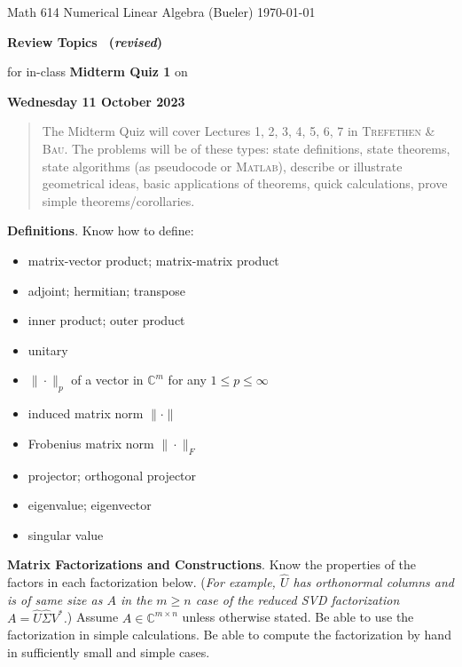 \documentclass[11pt]{amsart}
\newcommand{\normalspacing}{\renewcommand{\baselinestretch}{1.1}\tiny\normalsize}
\newcommand{\bigspacing}{\renewcommand{\baselinestretch}{1.21}\tiny\normalsize}
\newcommand{\CC}{{\mathbb{C}}}
\newcommand{\Matlab}{\textsc{Matlab}\xspace}
\newcommand{\textbook}{\textsc{Trefethen \& Bau}}
\begin{document}
\scriptsize \noindent Math 614 Numerical Linear Algebra (Bueler) \hfill \today
\thispagestyle{empty}

\bigskip
\Large\centerline{\phantom{sd asdf fklj} \textbf{Review Topics \, (\emph{revised})} }

\Large\centerline{for in-class \textbf{Midterm Quiz 1} on}

\Large\centerline{\textbf{Wednesday 11 October 2023}}

\normalsize
\bigskip
\begin{quote}
The Midterm Quiz will cover Lectures 1, 2, 3, 4, 5, 6, 7 in \textbook.  The problems will be of these types: state definitions, state theorems, state algorithms (as pseudocode or \Matlab), describe or illustrate geometrical ideas, basic applications of theorems, quick calculations, prove simple theorems/corollaries.
\end{quote}
\bigskip

\bigspacing
\noindent \textbf{Definitions}. Know how to define:
\begin{itemize}
\item matrix-vector product; matrix-matrix product
\item adjoint; hermitian; transpose
\item inner product; outer product
\item unitary
\item $\|\cdot\|_p$ of a vector in $\CC^m$ for any $1\le p \le \infty$
\item induced matrix norm $\|\cdot\|$
\item Frobenius matrix norm $\|\cdot\|_F$
\item projector; orthogonal projector
\item eigenvalue; eigenvector
\item singular value
\end{itemize}

\normalspacing

\medskip\noindent \textbf{Matrix Factorizations and Constructions}.  Know the properties of the factors in each factorization below.  (\emph{For example, $\hat U$ has orthonormal columns and is of same size as $A$ in the $m\ge n$ case of the reduced SVD factorization $A=\hat U \hat \Sigma V^*$.})  Assume $A\in \CC^{m\times n}$ unless otherwise stated.  Be able to use the factorization in simple calculations.  Be able to compute the factorization by hand in sufficiently small and simple cases.
\end{document}
